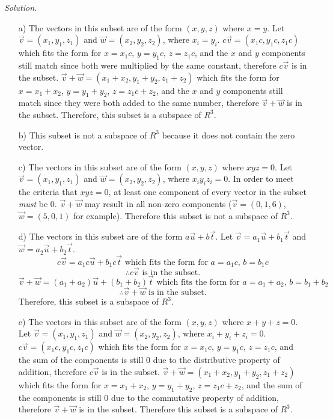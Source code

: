 \documentclass[12pt]{article}
\begin{document}
\begin{itemize}
\textit{Solution.}
\begin{itemize}
\item[a)] The vectors in this subset are of the form $(x, y, z)$ where $x=y$. Let $\vec{v}=(x_1,y_1,z_1)$ and $\vec{w}=(x_2,y_2,z_2)$, where $x_i=y_i$. $c\vec{v}=(x_1c,y_1c,z_1c)$ which fits the form for $x=x_1c$, $y=y_1c$, $z=z_1c$, and the $x$ and $y$ components still match since both were multiplied by the same constant, therefore $c\vec{v}$ is in the subset. $\vec{v}+\vec{w}=(x_1+x_2,y_1+y_2,z_1+z_2)$ which fits the form for $x=x_1+x_2$, $y=y_1+y_2$, $z=z_1c+z_2$, and the $x$ and $y$ components still match since they were both added to the same number, therefore $\vec{v}+\vec{w}$ is in the subset. Therefore, this subset is a subspace of $R^3$.
\item[b)] This subset is not a subspace of $R^3$ because it does not contain the zero vector.
\item[c)] The vectors in this subset are of the form $(x, y, z)$ where $xyz=0$. Let $\vec{v}=(x_1,y_1,z_1)$ and $\vec{w}=(x_2,y_2,z_2)$, where $x_iy_iz_i=0$. In order to meet the criteria that $xyz=0$, at least one component of every vector in the subset \textit{must} be 0. $\vec{v}+\vec{w}$ may result in all non-zero components ($\vec{v}=(0,1,6)$, $\vec{w}=(5,0,1)$ for example). Therefore this subset is not a subspace of $R^3$.
\item[d)] The vectors in this subset are of the form $a\vec{u}+b\vec{t}$. Let $\vec{v}=a_1\vec{u}+b_1\vec{t}$ and $\vec{w}=a_2\vec{u}+b_2\vec{t}$. 
\begin{equation*}
c\vec{v}=a_1c\vec{u}+b_1c\vec{t} \text{ which fits the form for } a=a_1c \text{, } b=b_1c 
\end{equation*}
\begin{equation*}
\therefore c\vec{v} \text{ is in the subset.}
\end{equation*}
\begin{equation*}
\vec{v}+\vec{w}=(a_1+a_2)\vec{u}+(b_1+b_2)\vec{t}\text{ which fits the form for } a=a_1+a_2 \text{, } b=b_1+b_2 
\end{equation*}
\begin{equation*}
\therefore \vec{v}+\vec{w} \text{ is in the subset.}
\end{equation*} Therefore, this subset is a subspace of $R^3$.
\item[e)] The vectors in this subset are of the form $(x, y, z)$ where $x+y+z=0$. Let $\vec{v}=(x_1,y_1,z_1)$ and $\vec{w}=(x_2,y_2,z_2)$, where $x_i+y_i+z_i=0$. $c\vec{v}=(x_1c,y_1c,z_1c)$ which fits the form for $x=x_1c$, $y=y_1c$, $z=z_1c$, and the sum of the components is still 0 due to the distributive property of addition, therefore $c\vec{v}$ is in the subset. $\vec{v}+\vec{w}=(x_1+x_2,y_1+y_2,z_1+z_2)$ which fits the form for $x=x_1+x_2$, $y=y_1+y_2$, $z=z_1c+z_2$, and the sum of the components is still 0 due to the commutative property of addition, therefore $\vec{v}+\vec{w}$ is in the subset. Therefore this subset is a subspace of $R^3$.

\end{itemize}
\end{itemize}
\end{document}
